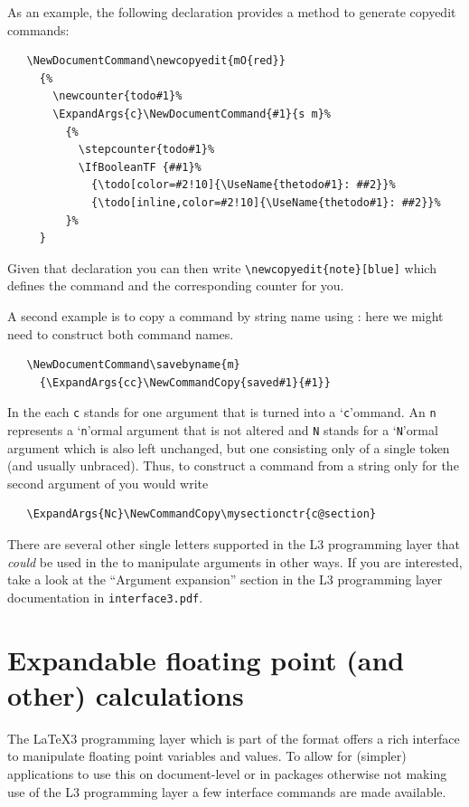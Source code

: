 \documentclass{ltxguide}
\begin{document}
As an example, the following declaration provides a method to generate
copyedit commands:
\begin{verbatim}
   \NewDocumentCommand\newcopyedit{mO{red}}
     {%
       \newcounter{todo#1}%
       \ExpandArgs{c}\NewDocumentCommand{#1}{s m}%
         {%
           \stepcounter{todo#1}%
           \IfBooleanTF {##1}%
             {\todo[color=#2!10]{\UseName{thetodo#1}: ##2}}%
             {\todo[inline,color=#2!10]{\UseName{thetodo#1}: ##2}}%
         }%
     }
\end{verbatim}
Given that declaration you can then write
\verb/\newcopyedit{note}[blue]/ which defines the command 
and the corresponding counter for you.

A second example is to copy a command by string name using
: here we might need to construct both command
names.
\begin{verbatim}
   \NewDocumentCommand\savebyname{m}
     {\ExpandArgs{cc}\NewCommandCopy{saved#1}{#1}}
\end{verbatim}

In the  each \texttt{c} stands for one argument that is
turned into a `\texttt{c}'ommand. An \texttt{n} represents a
`\texttt{n}'ormal argument that is not altered and \texttt{N} stands for
a `\texttt{N}'ormal argument which is also left unchanged, but one
consisting only of a single token (and usually unbraced). Thus, to
construct a command from a string only for the second argument of
 you would write
\begin{verbatim}
   \ExpandArgs{Nc}\NewCommandCopy\mysectionctr{c@section}
\end{verbatim}
There are several other single letters supported in the L3 programming
layer that \emph{could} be used in the  to manipulate
arguments in other ways.  If you are interested, take a look at the
\enquote{Argument expansion} section in the L3 programming layer
documentation in \texttt{interface3.pdf}.



\section{Expandable floating point (and other) calculations}

The \LaTeX3 programming layer which is part of the format offers a
rich interface to manipulate floating point variables and values. To
allow for (simpler) applications to use this on document-level or in
packages otherwise not making use of the L3 programming layer a few
interface commands are made available.
\end{document}
